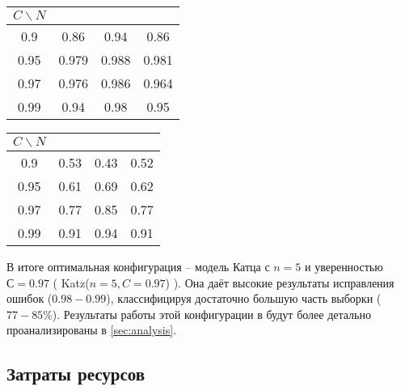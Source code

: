 \begin{multicols}{2}
	\begin{tabular}{|c|c|c|c|}\hline
		$C \backslash N$ & \KG & \BS & \MX \\ \hline
		0.9 & 0.86 & 0.94 & 0.86 \\
		0.95 & 0.979 & 0.988 & 0.981 \\
		0.97 & 0.976  & 0.986 & 0.964  \\
		0.99 & 0.94 & 0.98 & 0.95 \\ \hline 	
	\end{tabular}

	\begin{tabular}{|c|c|c|c|}\hline
		$C \backslash N$ & \KG & \BS & \MX \\ \hline
		0.9 & 0.53 & 0.43 & 0.52 \\
		0.95 & 0.61 & 0.69 & 0.62 \\
		0.97 & 0.77 & 0.85  & 0.77  \\
		0.99 & 0.91 & 0.94 & 0.91 \\ \hline 	
	\end{tabular}
\end{multicols}

\vspace{20pt}

В итоге оптимальная конфигурация -- модель Катца с $n=5$ и уверенностью $С=0.97$ ( Katz($n=5, C=0.97$) ). Она даёт высокие результаты исправления ошибок ($0.98-0.99$), классифицируя достаточно большую часть выборки ($77-85 \%$). Результаты работы этой конфигурации в будут более детально проанализированы в \cref{sec:analysis}.

\subsection{ Затраты ресурсов }

